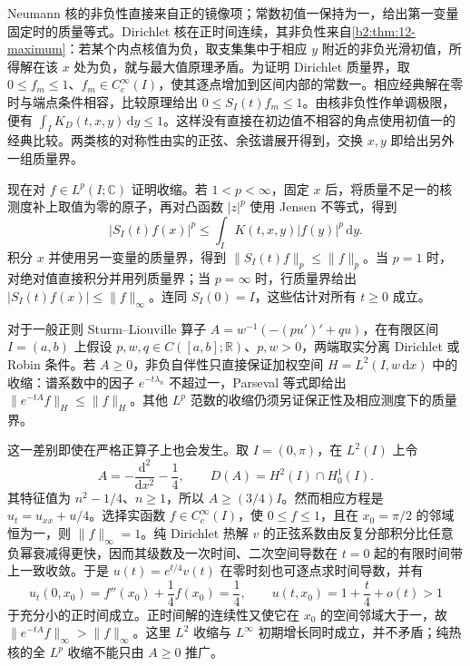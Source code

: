 Neumann 核的非负性直接来自正的镜像项；常数初值一保持为一，给出第一变量固定时的质量等式。Dirichlet 核在正时间连续，其非负性来自\cref{b2:thm:12-maximum}：若某个内点核值为负，取支集集中于相应 \(y\) 附近的非负光滑初值，所得解在该 \(x\) 处为负，就与最大值原理矛盾。为证明 Dirichlet 质量界，取 \(0\leq f_m\leq1\)、\(f_m\in C_c^\infty(I)\)，使其逐点增加到区间内部的常数一。相应经典解在零时与端点条件相容，比较原理给出 \(0\leq S_I(t)f_m\leq1\)。由核非负性作单调极限，便有 \(\int_I K_D(t,x,y)\,\mathrm{d}y\leq1\)。这样没有直接在初边值不相容的角点使用初值一的经典比较。两类核的对称性由实的正弦、余弦谱展开得到，交换 \(x,y\) 即给出另外一组质量界。

现在对 \(f\in L^p(I;\mathbb C)\) 证明收缩。若 \(1<p<\infty\)，固定 \(x\) 后，将质量不足一的核测度补上取值为零的原子，再对凸函数 \(|z|^p\) 使用 Jensen 不等式，得到
\[
 |S_I(t)f(x)|^p\leq\int_I K(t,x,y)|f(y)|^p\,\mathrm{d}y.
\]
积分 \(x\) 并使用另一变量的质量界，得到 \(\|S_I(t)f\|_p\leq\|f\|_p\)。当 \(p=1\) 时，对绝对值直接积分并用列质量界；当 \(p=\infty\) 时，行质量界给出 \(|S_I(t)f(x)|\leq\|f\|_\infty\)。连同 \(S_I(0)=I\)，这些估计对所有 \(t\geq0\) 成立。

\ProseParagraphBreak

对于一般正则 Sturm--Liouville 算子 \(A=w^{-1}(-(pu')'+qu)\)，在有限区间 \(I=(a,b)\) 上假设 \(p,w,q\in C([a,b];\mathbb R)\)、\(p,w>0\)，两端取实分离 Dirichlet 或 Robin 条件。若 \(A\geq0\)，非负自伴性只直接保证加权空间 \(H=L^2(I,w\,\mathrm{d}x)\) 中的收缩：谱系数中的因子 \(e^{-t\lambda_n}\) 不超过一，Parseval 等式即给出 \(\|e^{-tA}f\|_H\leq\|f\|_H\)。其他 \(L^p\) 范数的收缩仍须另证保正性及相应测度下的质量界。

这一差别即使在严格正算子上也会发生。取 \(I=(0,\pi)\)，在 \(L^2(I)\) 上令
\[
 A=-\frac{\mathrm{d}^2}{\mathrm{d}x^2}-\frac14,
 \qquad D(A)=H^2(I)\cap H_0^1(I).
\]
其特征值为 \(n^2-1/4\)、\(n\geq1\)，所以 \(A\geq(3/4)I\)。然而相应方程是 \(u_t=u_{xx}+u/4\)。选择实函数 \(f\in C_c^\infty(I)\)，使 \(0\leq f\leq1\)，且在 \(x_0=\pi/2\) 的邻域恒为一，则 \(\|f\|_\infty=1\)。纯 Dirichlet 热解 \(v\) 的正弦系数由反复分部积分比任意负幂衰减得更快，因而其级数及一次时间、二次空间导数在 \(t=0\) 起的有限时间带上一致收敛。于是 \(u(t)=e^{t/4}v(t)\) 在零时刻也可逐点求时间导数，并有
\[
 u_t(0,x_0)=f''(x_0)+\frac14f(x_0)=\frac14,
 \qquad u(t,x_0)=1+\frac t4+o(t)>1
\]
于充分小的正时间成立。正时间解的连续性又使它在 \(x_0\) 的空间邻域大于一，故 \(\|e^{-tA}f\|_\infty>\|f\|_\infty\)。这里 \(L^2\) 收缩与 \(L^\infty\) 初期增长同时成立，并不矛盾；纯热核的全 \(L^p\) 收缩不能只由 \(A\geq0\) 推广。

